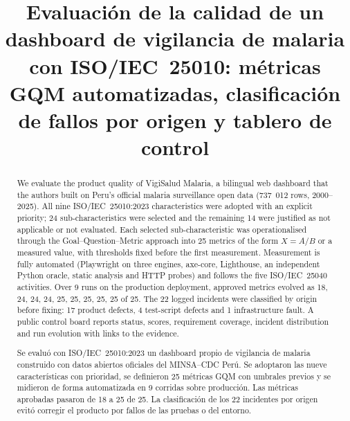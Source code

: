 \documentclass[conference,a4paper]{IEEEtran}
\begin{document}
\title{Evaluación de la calidad de un dashboard de vigilancia de malaria con ISO/IEC~25010: métricas GQM automatizadas, clasificación de fallos por origen y tablero de control}

\author{
}

\maketitle

\renewcommand{\abstractname}{Abstract}
\begin{abstract}
We evaluate the product quality of VigiSalud Malaria, a bilingual web dashboard that the authors built on Peru's official malaria surveillance open data (737~012 rows, 2000--2025). All nine ISO/IEC~25010:2023 characteristics were adopted with an explicit priority; 24 sub-characteristics were selected and the remaining 14 were justified as not applicable or not evaluated. Each selected sub-characteristic was operationalised through the Goal--Question--Metric approach into 25 metrics of the form $X=A/B$ or a measured value, with thresholds fixed before the first measurement. Measurement is fully automated (Playwright on three engines, axe-core, Lighthouse, an independent Python oracle, static analysis and HTTP probes) and follows the five ISO/IEC~25040 activities. Over 9 runs on the production deployment, approved metrics evolved as 18, 24, 24, 24, 25, 25, 25, 25, 25 of 25. The 22 logged incidents were classified by origin before fixing: 17 product defects, 4 test-script defects and 1 infrastructure fault. A public control board reports status, scores, requirement coverage, incident distribution and run evolution with links to the evidence.
\end{abstract}

\renewcommand{\abstractname}{Resumen}
\begin{abstract}
Se evaluó con ISO/IEC~25010:2023 un dashboard propio de vigilancia de malaria construido con datos abiertos oficiales del MINSA--CDC Perú. Se adoptaron las nueve características con prioridad, se definieron 25 métricas GQM con umbrales previos y se midieron de forma automatizada en 9 corridas sobre producción. Las métricas aprobadas pasaron de 18 a 25 de 25. La clasificación de los 22 incidentes por origen evitó corregir el producto por fallos de las pruebas o del entorno.
\end{abstract}
\end{document}
